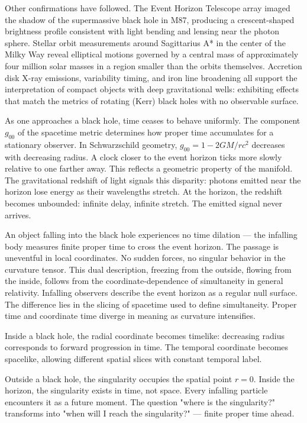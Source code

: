 Other confirmations have followed. The Event Horizon Telescope array imaged the shadow of the supermassive black hole in M87, producing a crescent-shaped brightness profile consistent with light bending and lensing near the photon sphere. Stellar orbit measurements around Sagittarius A* in the center of the Milky Way reveal elliptical motions governed by a central mass of approximately four million solar masses in a region smaller than the orbits themselves. Accretion disk X-ray emissions, variability timing, and iron line broadening all support the interpretation of compact objects with deep gravitational wells: exhibiting effects that match the metrics of rotating (Kerr) black holes with no observable surface.

As one approaches a black hole, time ceases to behave uniformly. The component $g_{00}$ of the spacetime metric determines how proper time accumulates for a stationary observer. In Schwarzschild geometry, $g_{00} = 1 - 2GM/rc^2$ decreases with decreasing radius. A clock closer to the event horizon ticks more slowly relative to one farther away. This reflects a geometric property of the manifold. The gravitational redshift of light signals this disparity: photons emitted near the horizon lose energy as their wavelengths stretch. At the horizon, the redshift becomes unbounded: infinite delay, infinite stretch. The emitted signal never arrives.

An object falling into the black hole experiences no time dilation — the infalling body measures finite proper time to cross the event horizon. The passage is uneventful in local coordinates. No sudden forces, no singular behavior in the curvature tensor. This dual description, freezing from the outside, flowing from the inside, follows from the coordinate-dependence of simultaneity in general relativity. Infalling observers describe the event horizon as a regular null surface. The difference lies in the slicing of spacetime used to define simultaneity. Proper time and coordinate time diverge in meaning as curvature intensifies.

Inside a black hole, the radial coordinate becomes timelike: decreasing radius corresponds to forward progression in time. The temporal coordinate becomes spacelike, allowing different spatial slices with constant temporal label.

Outside a black hole, the singularity occupies the spatial point $r = 0$. Inside the horizon, the singularity exists in time, not space. Every infalling particle encounters it as a future moment. The question "where is the singularity?" transforms into "when will I reach the singularity?" — finite proper time ahead.

